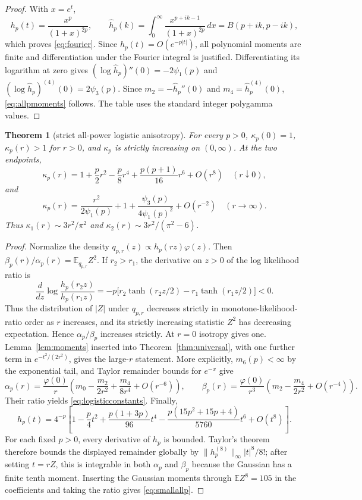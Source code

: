 \documentclass[11pt]{article}
\newtheorem{theorem}{Theorem}[section]
\newcommand{\E}{\mathbb E}
\begin{document}
\begin{proof}
With $x=e^t$,
\[
 h_p(t)=\frac{x^p}{(1+x)^{2p}},\qquad
 \widehat h_p(k)=\int_0^\infty\frac{x^{p+ik-1}}{(1+x)^{2p}}\,dx
 =B(p+ik,p-ik),
\]
which proves \eqref{eq:fourier}.  Since $h_p(t)=O(e^{-p|t|})$, all polynomial moments are finite and
differentiation under the Fourier integral is justified.  Differentiating its logarithm at zero gives
$(\log\widehat h_p)''(0)=-2\psi_1(p)$ and
$(\log\widehat h_p)^{(4)}(0)=2\psi_3(p)$.  Since
$m_2=-\widehat h_p''(0)$ and $m_4=\widehat h_p^{(4)}(0)$,
\eqref{eq:allpmoments} follows.  The table uses the standard integer polygamma values.
\end{proof}

\begin{theorem}[strict all-power logistic anisotropy]
\label{thm:monotone}
For every $p>0$, $\kappa_p(0)=1$, $\kappa_p(r)>1$ for $r>0$, and $\kappa_p$ is strictly increasing on
$(0,\infty)$.  At the two endpoints,
\begin{equation}
 \kappa_p(r)=1+\frac p2r^2-\frac p8r^4+\frac{p(p+1)}{16}r^6+O(r^8)
 \quad(r\downarrow0),
 \label{eq:smallallp}
\end{equation}
and
\begin{equation}
 \kappa_p(r)=\frac{r^2}{2\psi_1(p)}
 +1+\frac{\psi_3(p)}{4\psi_1(p)^2}+O(r^{-2})
 \quad(r\to\infty).
 \label{eq:logisticconstants}
\end{equation}
Thus $\kappa_1(r)\sim3r^2/\pi^2$ and
$\kappa_2(r)\sim3r^2/(\pi^2-6)$.
\end{theorem}

\begin{proof}
Normalize the density $q_{p,r}(z)\propto h_p(rz)\varphi(z)$.  Then
$\beta_p(r)/\alpha_p(r)=\E_{q_{p,r}}Z^2$.  If $r_2>r_1$, the derivative on $z>0$ of the log likelihood ratio is
\[
 \frac d{dz}\log\frac{h_p(r_2z)}{h_p(r_1z)}
 =-p\bigl[r_2\tanh(r_2z/2)-r_1\tanh(r_1z/2)\bigr]<0.
\]
Thus the distribution of $|Z|$ under $q_{p,r}$ decreases strictly in monotone-likelihood-ratio order as $r$
increases, and its strictly increasing statistic $Z^2$ has decreasing expectation.  Hence $\alpha_p/\beta_p$
increases strictly.  At $r=0$ isotropy gives one.  Lemma~\ref{lem:moments} inserted into
Theorem~\ref{thm:universal}, with one further term in
$e^{-t^2/(2r^2)}$, gives the large-$r$ statement.  More explicitly, $m_6(p)<\infty$ by the exponential tail,
and Taylor remainder bounds for $e^{-x}$ give
\[
 \alpha_p(r)=\frac{\varphi(0)}r\left(m_0-\frac{m_2}{2r^2}
 +\frac{m_4}{8r^4}+O(r^{-6})\right),\qquad
 \beta_p(r)=\frac{\varphi(0)}{r^3}\left(m_2-\frac{m_4}{2r^2}
 +O(r^{-4})\right).
\]
Their ratio yields \eqref{eq:logisticconstants}.  Finally,
\[
 h_p(t)=4^{-p}\left[1-\frac p4t^2+\frac{p(1+3p)}{96}t^4
 -\frac{p(15p^2+15p+4)}{5760}t^6+O(t^8)\right].
\]
For each fixed $p>0$, every derivative of $h_p$ is bounded.  Taylor's theorem therefore bounds the displayed
remainder globally by $\lVert h_p^{(8)}\rVert_\infty |t|^8/8!$; after setting $t=rZ$, this is integrable in both
$\alpha_p$ and $\beta_p$ because the Gaussian has a finite tenth moment.  Inserting the Gaussian moments through
$\E Z^8=105$ in the coefficients and taking the ratio gives \eqref{eq:smallallp}.
\end{proof}
\end{document}
